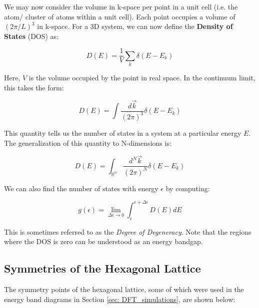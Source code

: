 \documentclass[]{article}
\begin{document}
We may now consider the volume in k-space per point in a unit cell (i.e. the atom/ cluster of atoms within a unit cell). Each point occupies a volume of $(2\pi/L)^3$ in k-space. For a 3D system, we can now define the \textbf{Density of States} (DOS) as:

\begin{equation}
D(E) = \frac{1}{V} \sum_k \delta(E-E_k)
\end{equation}

Here, $V$ is the volume occupied by the point in real space. In the continuum limit, this takes the form:

\begin{equation}
D(E) = \int \frac{d\vec{k}}{(2\pi)^3} \delta(E-E_k)
\end{equation}

This quantity tells us the number of states in a system at a particular energy $E$. The generalization of this quantity to N-dimensions is:

\begin{equation}
	D(E) = \int_{\mathbb{R^{N}}} \frac{d^N\vec{k}}{(2\pi)^N} \delta(E-E_k)
\end{equation}
 
We can also find the number of states with energy $\epsilon$ by computing:

\begin{equation}
	g(\epsilon) = \lim_{\Delta \epsilon \to 0}\int_{\epsilon}^{\epsilon + \Delta \epsilon} D(E)dE
\end{equation}

This is sometimes referred to as the \textit{Degree of Degeneracy}. Note that the regions where the DOS is zero can be understood as an energy bandgap.

\newpage
\subsection{Symmetries of the Hexagonal Lattice}

The symmetry points of the hexagonal lattice, some of which were used in the energy band diagrams in Section \ref{sec: DFT_simulations}, are shown below:
\end{document}
